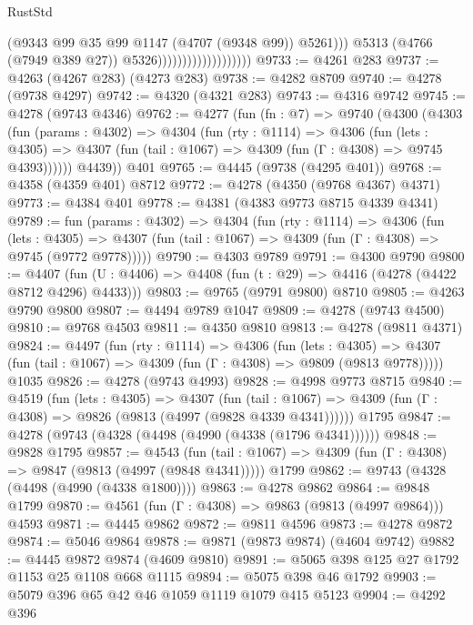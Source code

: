 \begin{lexlean}{RustStd}
\begin{coremodule}
{\begin{coremodule}
{{{{{{{{{{{{{{{{{{{{{{{{{{{{{{{{{{{                                              (@9343 @99 @35 @99 @1147 (@4707 (@9348 @99)) @5261)))
                                          @5313
                                          (@4766 (@7949 @389 @27))
                                          @5326)))))))))))))))))))
@9733 := @4261 @283
@9737 := @4263 (@4267 @283) (@4273 @283)
@9738 := @4282 @8709
@9740 := @4278 (@9738 @4297)
@9742 := @4320 (@4321 @283)
@9743 := @4316 @9742
@9745 := @4278 (@9743 @4346)
@9762 := @4277
    (fun (fn : @7) =>
    @9740
      (@4300
        (@4303
          (fun (params : @4302) =>
          @4304
            (fun (rty : @1114) =>
            @4306
              (fun (lets : @4305) =>
              @4307 (fun (tail : @1067) => @4309 (fun (Γ : @4308) => @9745 @4393))))))
        @4439))
    @401
@9765 := @4445 (@9738 (@4295 @401))
@9768 := @4358 (@4359 @401) @8712
@9772 := @4278 (@4350 (@9768 @4367) @4371)
@9773 := @4384 @401
@9778 := @4381 (@4383 @9773 @8715 @4339 @4341)
@9789 := fun (params : @4302) =>
  @4304
    (fun (rty : @1114) =>
    @4306
      (fun (lets : @4305) =>
      @4307 (fun (tail : @1067) => @4309 (fun (Γ : @4308) => @9745 (@9772 @9778)))))
@9790 := @4303 @9789
@9791 := @4300 @9790
@9800 := @4407 (fun (U : @4406) => @4408 (fun (t : @29) => @4416 (@4278 (@4422 @8712 @4296) @4433)))
@9803 := @9765 (@9791 @9800) @8710
@9805 := @4263 @9790 @9800
@9807 := @4494 @9789 @1047
@9809 := @4278 (@9743 @4500)
@9810 := @9768 @4503
@9811 := @4350 @9810
@9813 := @4278 (@9811 @4371)
@9824 := @4497
    (fun (rty : @1114) =>
    @4306
      (fun (lets : @4305) =>
      @4307 (fun (tail : @1067) => @4309 (fun (Γ : @4308) => @9809 (@9813 @9778)))))
    @1035
@9826 := @4278 (@9743 @4993)
@9828 := @4998 @9773 @8715
@9840 := @4519
    (fun (lets : @4305) =>
    @4307
      (fun (tail : @1067) => @4309 (fun (Γ : @4308) => @9826 (@9813 (@4997 (@9828 @4339 @4341))))))
    @1795
@9847 := @4278 (@9743 (@4328 (@4498 (@4990 (@4338 (@1796 @4341))))))
@9848 := @9828 @1795
@9857 := @4543
    (fun (tail : @1067) => @4309 (fun (Γ : @4308) => @9847 (@9813 (@4997 (@9848 @4341)))))
    @1799
@9862 := @9743 (@4328 (@4498 (@4990 (@4338 @1800))))
@9863 := @4278 @9862
@9864 := @9848 @1799
@9870 := @4561 (fun (Γ : @4308) => @9863 (@9813 (@4997 @9864))) @4593
@9871 := @4445 @9862
@9872 := @9811 @4596
@9873 := @4278 @9872
@9874 := @5046 @9864
@9878 := @9871 (@9873 @9874) (@4604 @9742)
@9882 := @4445 @9872 @9874 (@4609 @9810)
@9891 := @5065 @398 @125 @27 @1792 @1153 @25 @1108 @668 @1115
@9894 := @5075 @398 @46 @1792
@9903 := @5079 @396 @65 @42 @46 @1059 @1119 @1079 @415 @5123
@9904 := @4292 @396
}}}}}}}}}}}}}}}}}}}}}}}}}}}}}}}}}}}
\end{coremodule}}
\end{coremodule}
\end{lexlean}
